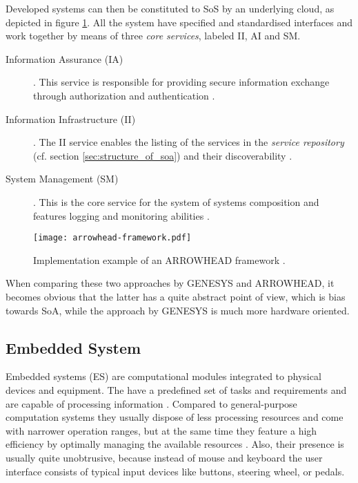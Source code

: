 Developed systems can then be constituted to SoS by an underlying cloud, as depicted in figure \ref{fig:arrowhead-framework}. All the system have specified and standardised interfaces and work together by means of three \emph{core services}, labeled II, AI and SM.
\begin{description}
\item [Information Assurance (IA)] .
This service is responsible for providing secure information exchange through authorization and authentication \cite{arrowhead:presentation}.
\item [Information Infrastructure (II)] .
The II service enables the listing of the services in the \emph{service repository} (cf. section \ref{sec:structure_of_soa}) and their discoverability \cite{arrowhead:presentation}.
\item [System Management (SM)] .
This is the core service for the system of systems composition and features logging and monitoring abilities \cite{arrowhead:presentation}.
\end{description}

\begin{figure}[!htbp]
\centering
\texttt{[image: arrowhead-framework.pdf]}
\caption{Implementation example of an ARROWHEAD framework \cite{arrowhead:presentation}.}
\label{fig:arrowhead-framework}
\end{figure}

When comparing these two approaches by GENESYS and ARROWHEAD, it becomes obvious that the latter has a quite abstract point of view, which is bias towards SoA, while the approach by GENESYS is much more hardware oriented.



\subsection{Embedded System}
\label{sec:embedded_system}

Embedded systems (ES) are computational modules integrated to physical devices and equipment. The have a predefined set of tasks and requirements and are capable of processing information \cite{rodrigues2011} \cite[p.xiii]{marwedel}. Compared to general-purpose computation systems they usually dispose of less processing resources and come with narrower operation ranges, but at the same time they feature a high efficiency by optimally managing the available resources \cite[p.283]{alippi} \cite[p.5]{marwedel}. Also, their presence is usually quite unobtrusive, because instead of mouse and keyboard the user interface consists of typical input devices like buttons, steering wheel, or pedals.

